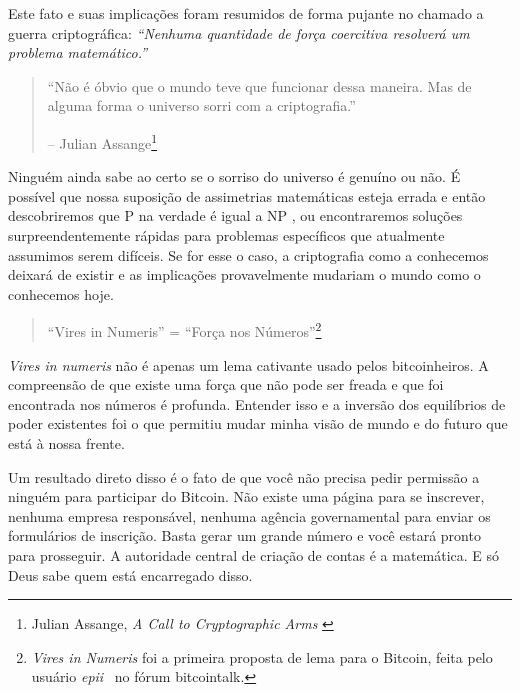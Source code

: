 Este fato e suas implicações foram resumidos de forma pujante no chamado a guerra criptográfica: \textit{\enquote{Nenhuma quantidade de força coercitiva resolverá um problema matemático.}}

\begin{quotation}\begin{samepage}
\enquote{Não é óbvio que o mundo teve que funcionar dessa maneira. Mas de alguma forma o universo sorri com a criptografia.}
\begin{flushright} -- Julian Assange\footnote{Julian Assange, \textit{A Call to Cryptographic Arms} \cite{call-to-cryptographic-arms}}
\end{flushright}\end{samepage}\end{quotation}

Ninguém ainda sabe ao certo se o sorriso do universo é genuíno ou não. É possível que nossa suposição de assimetrias matemáticas esteja errada e então descobriremos que P na verdade é igual a NP \cite{wiki:pnp}, ou encontraremos soluções surpreendentemente rápidas para problemas específicos \cite{wiki:discrete-log} que atualmente assumimos serem difíceis. Se for esse o caso, a criptografia como a conhecemos deixará de existir e as implicações provavelmente mudariam o mundo como o conhecemos hoje.

\begin{quotation}\begin{samepage}
\enquote{Vires in Numeris} = \enquote{Força nos Números}\footnote{\textit{Vires in Numeris} foi a primeira proposta de lema para o Bitcoin, feita pelo usuário \textit{epii}~\cite{epii} no fórum bitcointalk.}
\end{samepage}\end{quotation}

\textit{Vires in numeris} não é apenas um lema cativante usado pelos bitcoinheiros. A compreensão de que existe uma força que não pode ser freada e que foi encontrada nos números é profunda. Entender isso e a inversão dos equilíbrios de poder existentes foi o que permitiu mudar minha visão de mundo e do futuro que está à nossa frente.

Um resultado direto disso é o fato de que você não precisa pedir permissão a ninguém para participar do Bitcoin. Não existe uma página para se inscrever, nenhuma empresa responsável, nenhuma agência governamental para enviar os formulários de inscrição. Basta gerar um grande número e você estará pronto para prosseguir. A autoridade central de criação de contas é a matemática. E só Deus sabe quem está encarregado disso.

